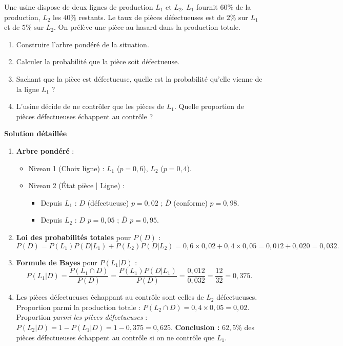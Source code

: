 \documentclass[11pt]{article}
\begin{document}
\begin{exoresolu}
Une usine dispose de deux lignes de production $L_1$ et $L_2$. $L_1$ fournit $60\%$ de la production, $L_2$ les $40\%$ restants.
Le taux de pièces défectueuses est de $2\%$ sur $L_1$ et de $5\%$ sur $L_2$.
On prélève une pièce au hasard dans la production totale.
\begin{enumerate}
    \item Construire l'arbre pondéré de la situation.
    \item Calculer la probabilité que la pièce soit défectueuse.
    \item Sachant que la pièce est défectueuse, quelle est la probabilité qu'elle vienne de la ligne $L_1$ ?
    \item L'usine décide de ne contrôler que les pièces de $L_1$. Quelle proportion de pièces défectueuses échappent au contrôle ?
\end{enumerate}
\tcblower
\textbf{Solution détaillée}
\begin{enumerate}
    \item \textbf{Arbre pondéré} :
    \begin{itemize}
        \item Niveau 1 (Choix ligne) : $L_1$ ($p=0,6$), $L_2$ ($p=0,4$).
        \item Niveau 2 (État pièce | Ligne) :
        \begin{itemize}
            \item Depuis $L_1$ : $D$ (défectueuse) $p=0,02$ ; $\overline{D}$ (conforme) $p=0,98$.
            \item Depuis $L_2$ : $D$ $p=0,05$ ; $\overline{D}$ $p=0,95$.
        \end{itemize}
    \end{itemize}
    \item \textbf{Loi des probabilités totales} pour $P(D)$ :
    \[ P(D) = P(L_1)P(D|L_1) + P(L_2)P(D|L_2) = 0,6 \times 0,02 + 0,4 \times 0,05 = 0,012 + 0,020 = 0,032. \]
    \item \textbf{Formule de Bayes} pour $P(L_1|D)$ :
    \[ P(L_1|D) = \frac{P(L_1 \cap D)}{P(D)} = \frac{P(L_1)P(D|L_1)}{P(D)} = \frac{0,012}{0,032} = \frac{12}{32} = 0,375. \]
    \item Les pièces défectueuses échappant au contrôle sont celles de $L_2$ défectueuses.
    Proportion parmi la production totale : $P(L_2 \cap D) = 0,4 \times 0,05 = 0,02$.
    Proportion \emph{parmi les pièces défectueuses} : $P(L_2|D) = 1 - P(L_1|D) = 1 - 0,375 = 0,625$.
    \textbf{Conclusion :} $62,5\%$ des pièces défectueuses échappent au contrôle si on ne contrôle que $L_1$.
\end{enumerate}
\end{exoresolu}
\end{document}
